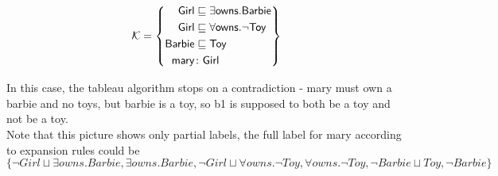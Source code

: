 \begin{myex}
\begin{align*}
  \mathcal{K} &= \left\{
      \begin{aligned}
       \mathsf{Girl} & \sqsubseteq \exists \mathsf{owns}.\mathsf{Barbie} \\
       \mathsf{Girl} & \sqsubseteq \forall \mathsf{owns}.\neg\mathsf{Toy} \\       
 		\mathsf{Barbie} & \sqsubseteq \mathsf{Toy} \\
  		\mathsf{mary} & \colon \mathsf{Girl}
      \end{aligned}
    \right\}\\
  \end{align*}

  \medskip
  \begin{center}
  \end{center}
In this case, the tableau algorithm stops on a contradiction - mary must own a barbie and no toys, but barbie is a toy, so b1 is supposed to both be a toy and not be a toy. \\
Note that this picture shows only partial labels, the full label for mary according to expansion rules could be $\{ \neg Girl \sqcup \exists owns.Barbie, \exists owns.Barbie, \neg Girl \sqcup \forall owns.\neg Toy, \forall owns.\neg Toy, \neg Barbie \sqcup Toy, \neg Barbie \}$
\end{myex}





